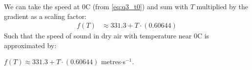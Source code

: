 We can take the speed at 0\degree C (from \ref{eq:q3_t0}) and sum with $T$
multiplied by the gradient as a scaling factor:
\begin{align}
  f(T) &\approx 331.3 + T\cdot(0.60644)
\end{align}
Such that the speed of sound in dry air with temperature near 0\degree C is
approximated by:\\
\begin{center}
  $f(T) \approx 331.3 + T\cdot(0.60644)$ metres$\cdot$s$^{-1}$.
\end{center}

